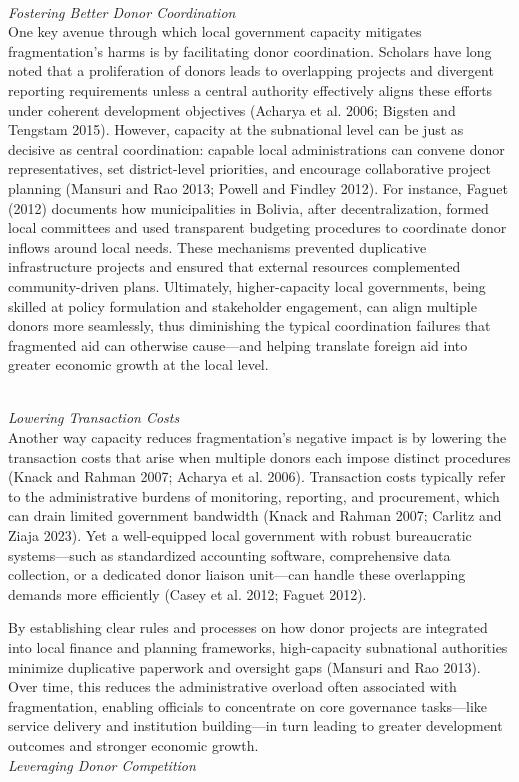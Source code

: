 \documentclass[11pt]{article}
\begin{document}
\vspace{.5cm} \\ 
\textit{Fostering Better Donor Coordination}\\
One key avenue through which local government capacity mitigates fragmentation’s harms is by facilitating donor coordination. Scholars have long noted that a proliferation of donors leads to overlapping projects and divergent reporting requirements unless a central authority effectively aligns these efforts under coherent development objectives (Acharya et al. 2006; Bigsten and Tengstam 2015). However, capacity at the subnational level can be just as decisive as central coordination: capable local administrations can convene donor representatives, set district-level priorities, and encourage collaborative project planning (Mansuri and Rao 2013; Powell and Findley 2012). For instance, Faguet (2012) documents how municipalities in Bolivia, after decentralization, formed local committees and used transparent budgeting procedures to coordinate donor inflows around local needs. These mechanisms prevented duplicative infrastructure projects and ensured that external resources complemented community-driven plans. Ultimately, higher-capacity local governments, being skilled at policy formulation and stakeholder engagement, can align multiple donors more seamlessly, thus diminishing the typical coordination failures that fragmented aid can otherwise cause—and helping translate foreign aid into greater economic growth at the local level.

\vspace{.5cm} \\ 
\textit{Lowering Transaction Costs}\\
Another way capacity reduces fragmentation’s negative impact is by lowering the transaction costs that arise when multiple donors each impose distinct procedures (Knack and Rahman 2007; Acharya et al. 2006). Transaction costs typically refer to the administrative burdens of monitoring, reporting, and procurement, which can drain limited government bandwidth (Knack and Rahman 2007; Carlitz and Ziaja 2023). Yet a well-equipped local government with robust bureaucratic systems—such as standardized accounting software, comprehensive data collection, or a dedicated donor liaison unit—can handle these overlapping demands more efficiently (Casey et al. 2012; Faguet 2012). 

By establishing clear rules and processes on how donor projects are integrated into local finance and planning frameworks, high-capacity subnational authorities minimize duplicative paperwork and oversight gaps (Mansuri and Rao 2013). Over time, this reduces the administrative overload often associated with fragmentation, enabling officials to concentrate on core governance tasks—like service delivery and institution building—in turn leading to greater development outcomes and stronger economic growth.\vspace{.5cm} \\ 
\textit{Leveraging Donor Competition}\\
\end{document}
